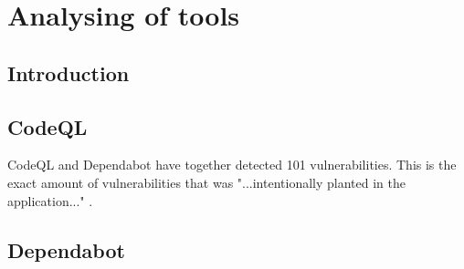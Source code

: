 \chapter{Analysing of tools}
\section{Introduction}

\section{CodeQL}
\begin{comment}
Postive: For free! Open source, easy to configure, integrated into github
\\
Negative: Open source (everyone can edit)
\\
\end{comment}
CodeQL and Dependabot have together detected 101 vulnerabilities. This is the exact amount of vulnerabilities that was "...intentionally planted in the application..." \cite{owaspJuiceShop}.

\section{Dependabot}

